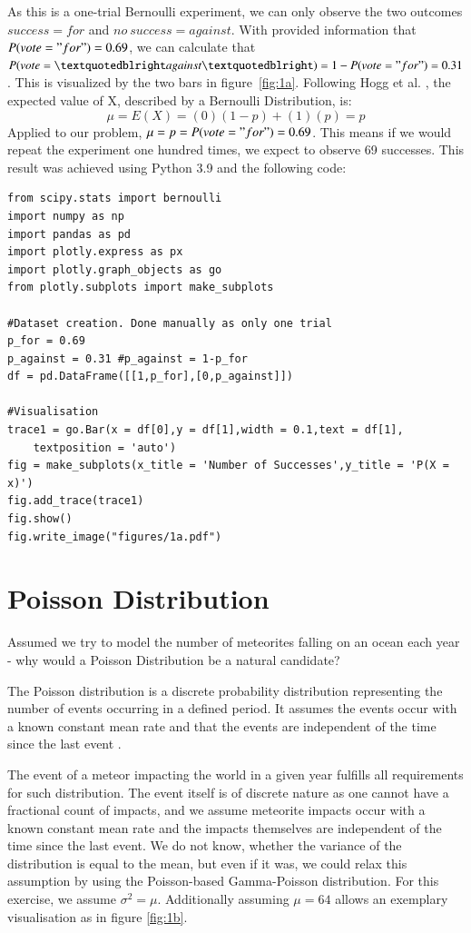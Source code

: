 As this is a one-trial Bernoulli experiment, we can only observe the two outcomes $success = for$ and $no~success = against$. With provided information that $P(vote = "for") = 0.69$, we can calculate that $P(vote=”against”) = 1 - P(vote = "for") = 0.31$. This is visualized by the two bars in figure~\eqref{fig:1a}. Following Hogg et al. \cite[Chapter~3.1]{hogg}, the expected value of X, described by a Bernoulli Distribution, is: 
\begin{equation}  \mu = E(X) = (0)(1-p) + (1)(p) = p
\label{eq:expvaluebernoulli}
\end{equation}
Applied to our problem,  $ \mu = p = P(vote = "for") = 0.69 $.
This means if we would repeat the experiment one hundred times, we expect to observe 69 successes. 
This result was achieved using Python 3.9 and the following code:
\begin{verbatim}
from scipy.stats import bernoulli
import numpy as np
import pandas as pd
import plotly.express as px
import plotly.graph_objects as go
from plotly.subplots import make_subplots

#Dataset creation. Done manually as only one trial
p_for = 0.69
p_against = 0.31 #p_against = 1-p_for
df = pd.DataFrame([[1,p_for],[0,p_against]])

#Visualisation
trace1 = go.Bar(x = df[0],y = df[1],width = 0.1,text = df[1], 
    textposition = 'auto')
fig = make_subplots(x_title = 'Number of Successes',y_title = 'P(X = x)')
fig.add_trace(trace1)
fig.show()
fig.write_image("figures/1a.pdf")
\end{verbatim}

\section{Poisson Distribution}

Assumed we try to model the number of meteorites falling on an ocean each year - why would a Poisson Distribution be a natural candidate?


The Poisson distribution is a discrete probability distribution representing the number of events occurring in a defined period. It assumes the events occur with a known constant mean rate and that the events are independent of the time since the last event \cite[Chapter~4.6]{illowsky2018introductory}.

The event of a meteor impacting the world in a given year fulfills all requirements for such distribution. The event itself is of discrete nature as one cannot have a fractional count of impacts, and we assume meteorite impacts occur with a known constant mean rate and the impacts themselves are independent of the time since the last event. We do not know, whether the variance of the distribution is equal to the mean, but even if it was, we could relax this assumption by using the Poisson-based Gamma-Poisson distribution. For this exercise, we assume $\sigma^2 = \mu$. Additionally assuming $\mu = 64$ allows an exemplary visualisation as in figure \eqref{fig:1b}.

